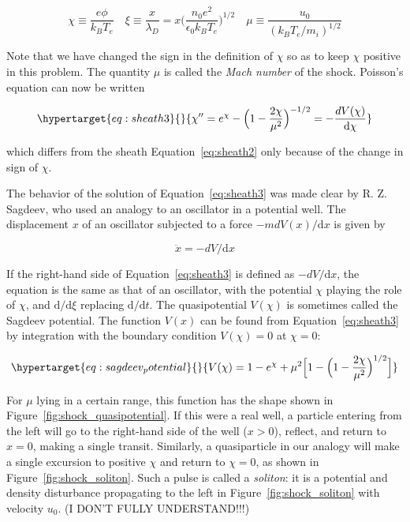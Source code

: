 \documentclass[
  notoc %
]{tufte-book}
\begin{document}
\[
\chi\equiv \frac{e\phi}{k_B T_e}\quad \xi\equiv\frac{x}{\lambda_D} = x\Big( \frac{n_0 e^2}{\epsilon_0 k_B T_e} \Big)^{1/2}\quad \mu\equiv\frac{u_0}{(k_B T_e/m_i)^{1/2}}
\]

Note that we have changed the sign in the definition of \(\chi\) so as
to keep \(\chi\) positive in this problem. The quantity \(\mu\) is
called the \emph{Mach number} of the shock. Poisson's equation can now
be written

\begin{equation}\protect\hypertarget{eq:sheath3}{}{
\chi^{\prime\prime} = e^{\chi} - \Big( 1 - \frac{2\chi}{\mu^2} \Big)^{-1/2} = -\frac{dV(\chi)}{\mathrm{d}\chi}
}\label{eq:sheath3}\end{equation}

which differs from the sheath Equation~\ref{eq:sheath2} only because of
the change in sign of \(\chi\).

The behavior of the solution of Equation~\ref{eq:sheath3} was made clear
by R. Z. Sagdeev, who used an analogy to an oscillator in a potential
well. The displacement \(x\) of an oscillator subjected to a force
\(-mdV(x)/\mathrm{d}x\) is given by

\[
\ddot{x} = -dV/\mathrm{d}x
\]

If the right-hand side of Equation~\ref{eq:sheath3} is defined as
\(-dV/\mathrm{d}x\), the equation is the same as that of an oscillator,
with the potential \(\chi\) playing the role of \(\chi\), and
\(\mathrm{d}/\mathrm{d}\xi\) replacing \(\mathrm{d}/\mathrm{d}t\). The
quasipotential \(V(\chi)\) is sometimes called the Sagdeev potential.
The function \(V(x)\) can be found from Equation~\ref{eq:sheath3} by
integration with the boundary condition \(V(\chi)=0\) at \(\chi=0\):

\begin{equation}\protect\hypertarget{eq:sagdeev_potential}{}{
V(\chi) = 1-e^\chi + \mu^2 \Big[ 1 - \Big( 1-\frac{2\chi}{\mu^2} \Big)^{1/2} \Big]
}\label{eq:sagdeev_potential}\end{equation}

For \(\mu\) lying in a certain range, this function has the shape shown
in Figure~\ref{fig:shock_quasipotential}. If this were a real well, a
particle entering from the left will go to the right-hand side of the
well (\(x>0\)), reflect, and return to \(x=0\), making a single transit.
Similarly, a quasiparticle in our analogy will make a single excursion
to positive \(\chi\) and return to \(\chi =0\), as shown in
Figure~\ref{fig:shock_soliton}. Such a pulse is called a \emph{soliton}:
it is a potential and density disturbance propagating to the left in
Figure~\ref{fig:shock_soliton} with velocity \(u_0\). (I DON'T FULLY
UNDERSTAND!!!)
\end{document}
